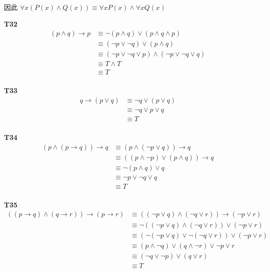 \documentclass[12pt, a4paper]{ctexart}
\begin{document}
因此 $\forall x(P(x) \land Q(x)) \equiv \forall x P(x) \land \forall x  Q(x)$

\textbf{T32}
\begin{align*}
    (p \land q) \rightarrow p &\equiv \lnot(p \land q) \lor (p \land q \land p)\\
    &\equiv (\lnot p \lor \lnot q) \lor (p \land q)\\
    &\equiv (\lnot p \lor \lnot q \lor p) \land (\lnot p \lor \lnot q \lor q)\\
    &\equiv T \land T\\
    &\equiv T\\
\end{align*}

\textbf{T33}
\begin{align*}
    q \rightarrow (p \lor q) &\equiv \lnot q \lor (p \lor q)\\
    &\equiv \lnot q \lor p \lor q\\
    &\equiv T\\
\end{align*}

\textbf{T34}
\begin{align*}
    (p \land (p \rightarrow q)) \rightarrow q &\equiv (p \land (\lnot p \lor q)) \rightarrow q\\
    &\equiv ((p \land \lnot p) \lor (p \land q)) \rightarrow q\\
    &\equiv \lnot(p \land q) \lor q\\
    &\equiv \lnot p \lor \lnot q \lor q\\
    &\equiv T\\
\end{align*}

\textbf{T35}
\begin{align*}
    ((p \rightarrow q) \land (q \rightarrow r)) \rightarrow (p \rightarrow r) &\equiv ((\lnot p \lor q) \land (\lnot q \lor r)) \rightarrow (\lnot p \lor r)\\
    &\equiv \lnot ((\lnot p \lor q) \land (\lnot q \lor r)) \lor (\lnot p \lor r)\\
    &\equiv (\lnot (\lnot p \lor q) \lor \lnot (\lnot q \lor r)) \lor (\lnot p \lor r)\\
    &\equiv (p \land \lnot q) \lor (q \land \lnot r) \lor \lnot p \lor r\\
    &\equiv (\lnot q \lor \lnot p) \lor (q \lor r)\\
    &\equiv T\\
\end{align*}
\end{document}
